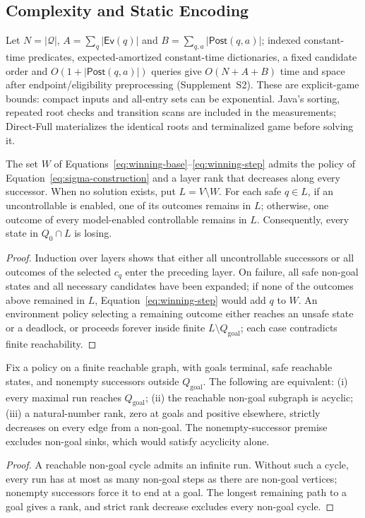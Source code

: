 \documentclass[acmsmall,screen,review,anonymous]{acmart}
\newcommand{\Post}{\mathsf{Post}}
\newcommand{\Goal}{Q_{\mathrm{goal}}}
\newcommand{\Ev}{\mathsf{Ev}}
\begin{document}
\subsection{Complexity and Static Encoding}

Let $N=|\mathcal Q|$, $A=\sum_q|\Ev(q)|$ and $B=\sum_{q,a}|\Post(q,a)|$; indexed constant-time predicates, expected-amortized constant-time dictionaries, a fixed candidate order and $O(1+|\Post(q,a)|)$ queries give $O(N+A+B)$ time and space after endpoint/eligibility preprocessing (Supplement~S2). These are explicit-game bounds: compact inputs and all-entry sets can be exponential. Java's sorting, repeated root checks and transition scans are included in the measurements; Direct-Full materializes the identical roots and terminalized game before solving it.

\begin{lemma}
\label{lem:attractor}
The set $W$ of Equations~\eqref{eq:winning-base}--\eqref{eq:winning-step} admits the policy of Equation~\eqref{eq:sigma-construction} and a layer rank that decreases along every successor. When no solution exists, put $L=V\setminus W$. For each safe $q\in L$, if an uncontrollable is enabled, one of its outcomes remains in $L$; otherwise, one outcome of every model-enabled controllable remains in $L$. Consequently, every state in $Q_0\cap L$ is losing.
\end{lemma}

\begin{proof}
Induction over layers shows that either all uncontrollable successors or all outcomes of the selected $c_q$ enter the preceding layer. On failure, all safe non-goal states and all necessary candidates have been expanded;
if none of the outcomes above remained in $L$, Equation~\eqref{eq:winning-step} would add $q$ to $W$. An environment policy selecting a remaining outcome either reaches an unsafe state or a deadlock,
or proceeds forever inside finite $L\setminus\Goal$; each case contradicts finite reachability.
\end{proof}

\begin{lemma}
\label{lem:finite-rank}
Fix a policy on a finite reachable graph, with goals terminal, safe reachable states, and nonempty successors outside $\Goal$. The following are equivalent: (i) every maximal run reaches $\Goal$; (ii) the reachable non-goal subgraph is acyclic; (iii) a natural-number rank, zero at goals and positive elsewhere, strictly decreases on every edge from a non-goal. The nonempty-successor premise excludes non-goal sinks, which would satisfy acyclicity alone.
\end{lemma}
\begin{proof}
A reachable non-goal cycle admits an infinite run. Without such a cycle, every run has at most as many non-goal steps as there are non-goal vertices; nonempty successors force it to end at a goal. The longest remaining path to a goal gives a rank, and strict rank decrease excludes every non-goal cycle.
\end{proof}
\end{document}
